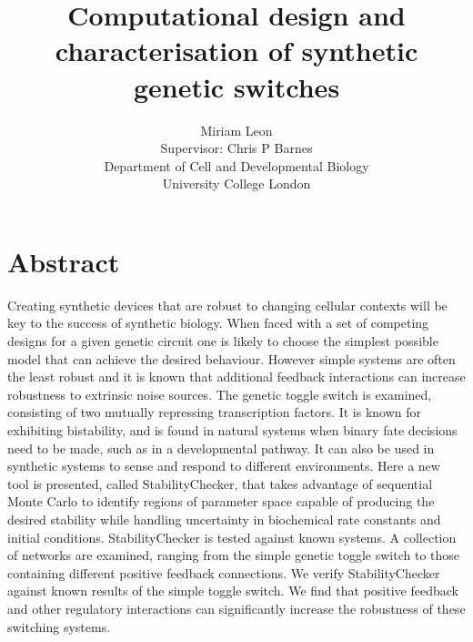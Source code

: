 \documentclass[]{phdthesis}
\begin{document}
\title{Computational design and characterisation of synthetic genetic switches}
\author{Miriam Leon \\ Supervisor: Chris P Barnes\\ Department of Cell and Developmental
 Biology \\ University College London}
\date{}
\maketitle



\newpage
\section{Abstract}
Creating synthetic devices that are robust to changing cellular contexts will be key to the success of 
synthetic biology. When faced with a set of competing designs for a given genetic circuit one is likely 
to choose the simplest possible model that can achieve the desired behaviour. However simple systems are 
often the least robust and it is known that additional feedback interactions can increase robustness to 
extrinsic noise sources. The genetic toggle switch is examined, consisting of two mutually repressing 
transcription factors. It is known for exhibiting bistability, and is found in natural systems when 
binary fate decisions need to be made, such as in a developmental pathway. It can also be used in 
synthetic systems to sense and respond to different environments.
\noindent
Here a new tool is presented, called StabilityChecker, that takes advantage of sequential Monte Carlo to 
identify regions of parameter space capable of producing the desired stability while handling uncertainty 
in biochemical rate constants and initial conditions. StabilityChecker is tested against known systems. A 
collection of networks are examined, ranging from the simple genetic toggle switch to those containing different 
positive feedback connections. 
\noindent
We verify StabilityChecker against known results of the simple toggle switch. We find that positive feedback 
and other regulatory interactions can significantly increase the robustness of these switching systems. 
\end{document}
